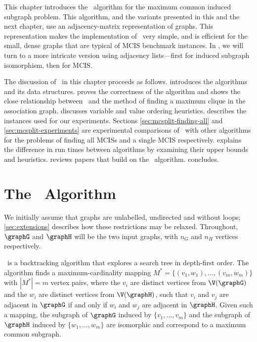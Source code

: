This chapter introduces the \McSplit\ algorithm for the
maximum common induced subgraph problem.  This algorithm, and the
variants presented in this and the next chapter, use an adjacency-matrix
representation of graphs. This representation makes the implementation of
\McSplit\ very simple, and is efficient for the small, dense graphs that are
typical of MCIS benchmark instances.  
In , we will turn to a more intricate version using
adjacency lists---first for induced subgraph isomorphism, then for
MCIS.

The discussion of \McSplit\ in this chapter proceeds as follows.
 introduces the algorithms and its data structures.
 proves the correctness of the algorithm
and shows the close relationship between \McSplit\ and the method of
finding a maximum clique in the association graph.
 discusses variable and value ordering
heuristics.
 describes the instances used for our experiments.
Sections \ref{sec:mcsplit-finding-all} and \ref{sec:mcsplit-experiments}
are experimental comparisons of
\McSplit\ with other algorithms for the problems of finding all
MCISs and a single MCIS respectively.
 explains the difference in run times between
algorithms by examining their upper bounds and heuristics.
 reviews papers that build on the \McSplit\
algorithm.
 concludes.

\section{The \McSplit\ Algorithm \label{sec:mcsplit}}

We initially assume that graphs are unlabelled, undirected and without loops;
\cref{sec:extensions} describes how these restrictions may be relaxed.
Throughout, $\graphG$ and $\graphH$ will be the two input graphs, with
$n_G$ and $n_H$ vertices respectively.

\McSplit\ is a backtracking algorithm that explores a search tree in depth-first
order.  
The algorithm
finds a maximum-cardinality mapping $M^* = \{(v_1, w_1), \dots, (v_{m},
w_{m})\}$ with $|M^*| = m$ vertex pairs, where the $v_i$ are distinct vertices
from $\V(\graphG)$ and the $w_i$ are distinct vertices from $\V(\graphH)$, such
that $v_i$ and $v_j$ are adjacent in $\graphG$ if and only if $w_i$ and $w_j$
are adjacent in $\graphH$.  Given such a mapping, the subgraph of $\graphG$
induced by $\{v_1, \dots, v_{m}\}$ and the subgraph of $\graphH$ induced by
$\{w_1, \dots, w_{m}\}$ are isomorphic and correspond to a maximum common subgraph.

